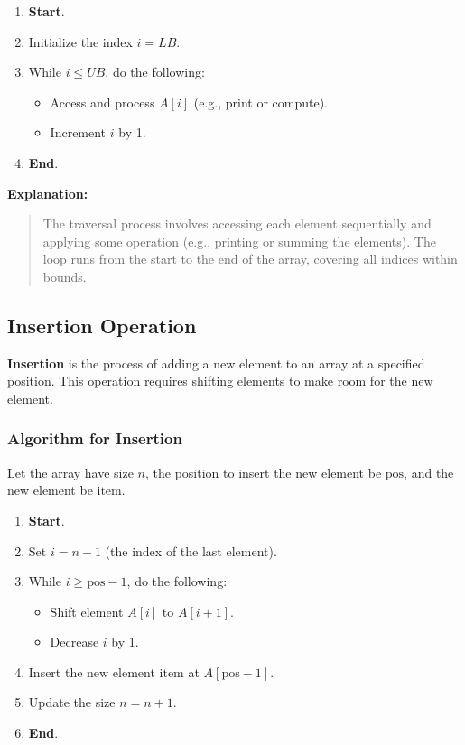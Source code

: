 \documentclass{book}
\begin{document}
\begin{enumerate}
	\item \textbf{Start}.
	\item Initialize the index $i = LB$.
	\item While $i \leq UB$, do the following:
	\begin{itemize}
		\item Access and process $A[i]$ (e.g., print or compute).
		\item Increment $i$ by 1.
	\end{itemize}
	\item \textbf{End}.
\end{enumerate}

\textbf{Explanation:}
\begin{quote}
	The traversal process involves accessing each element sequentially and applying some operation (e.g., printing or summing the elements). The loop runs from the start to the end of the array, covering all indices within bounds.
\end{quote}

\subsection{Insertion Operation}

\textbf{Insertion} is the process of adding a new element to an array at a specified position. This operation requires shifting elements to make room for the new element.

\subsubsection*{Algorithm for Insertion}

Let the array have size $n$, the position to insert the new element be $\text{pos}$, and the new element be $\text{item}$.

\begin{enumerate}
	\item \textbf{Start}.
	\item Set $i = n - 1$ (the index of the last element).
	\item While $i \geq \text{pos} - 1$, do the following:
	\begin{itemize}
		\item Shift element $A[i]$ to $A[i + 1]$.
		\item Decrease $i$ by 1.
	\end{itemize}
	\item Insert the new element $\text{item}$ at $A[\text{pos} - 1]$.
	\item Update the size $n = n + 1$.
	\item \textbf{End}.
\end{enumerate}
\end{document}
